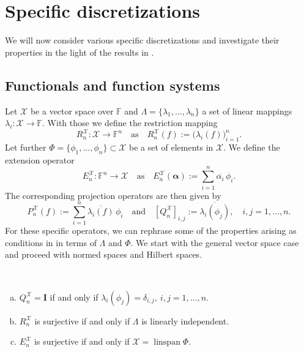 \documentclass[a4paper]{paper}
\newcommand{\Spc}[1]{\mathscr{#1}}
\newcommand{\Field}{\mathbb{F}}
\newcommand*{\EXT}[2]{\ensuremath{E_{#1}^{#2}}}
\newcommand*{\REST}[2]{\ensuremath{R_{#1}^{#2}}}
\newcommand*{\PROJ}[2]{\ensuremath{P_{#1}^{#2}}}
\newcommand*{\COPROJ}[2]{\ensuremath{Q_{#1}^{#2}}}
\newcommand*{\RnX}{\ensuremath{\REST{n}{\Spc{X}}}}
\newcommand*{\EnX}{\ensuremath{\EXT{n}{\Spc{X}}}}
\newcommand*{\PnX}{\ensuremath{\PROJ{n}{\Spc{X}}}}
\newcommand*{\QnX}{\ensuremath{\COPROJ{n}{\Spc{X}}}}
\DeclareMathOperator{\linspan}{linspan}
\newcommand{\valpha}{\boldsymbol{\alpha}}
\newcommand{\vI}{\boldsymbol{I}}
\begin{document}
\section{Specific discretizations}
\label{sec:specif}

We will now consider various specific discretizations and investigate their properties in the light of the 
results in .



\subsection{Functionals and function systems}
\label{subsec:specif:funct}

Let $\Spc{X}$ be a vector space over $\Field$ and $\Lambda = \{\lambda_1, \ldots, \lambda_n\}$ a set of linear mappings
$\lambda_i \colon \Spc{X} \to \Field$. With those we define the restriction mapping
%
\begin{equation*}
 \RnX \colon \Spc{X} \to \Field^n \quad \text{as} \quad \RnX(f) := \big( \lambda_i(f) \big)_{i=1}^n.
\end{equation*}
%
Let further $\Phi=\{\phi_1, \ldots, \phi_n\} \subset \Spc{X}$ be a set of elements in $\Spc{X}$. We define the 
extension operator
%
\begin{equation*}
 \EnX \colon \Field^n \to \Spc{X} \quad \text{as} \quad \EnX(\valpha) := \sum_{i=1}^n \overline{\alpha_i}\, \phi_i.
\end{equation*}
%
The corresponding projection operators are then given by
%
\begin{equation*}
 \PnX(f) := \sum_{i=1}^n \overline{\lambda_i(f)}\, \phi_i
 \quad \text{and} \quad
 \left[ \QnX \right]_{i,j} := \overline{\lambda_i(\phi_j)},\quad i,j=1,\ldots,n.
\end{equation*}
%
For these specific operators, we can rephrase some of the properties arising as conditions in  
in terms of $\Lambda$ and $\Phi$. We start with the general vector space case and proceed with normed spaces and 
Hilbert spaces.


\begin{lemma}~
 \label{lemma:specif:funct:op_prop_vecspace}
 \begin{enumerate}[(a)]
  \item $\QnX = \vI$ if and only if $\lambda_i(\phi_j) = \delta_{i,j},\ i,j=1,\ldots,n$.
  
  \item $\RnX$ is surjective if and only if $\Lambda$ is linearly independent.
  
  \item $\EnX$ is surjective if and only if $\Spc{X} = \linspan \Phi$.
 \end{enumerate}
\end{lemma}
\vspace{1em}
\end{document}
